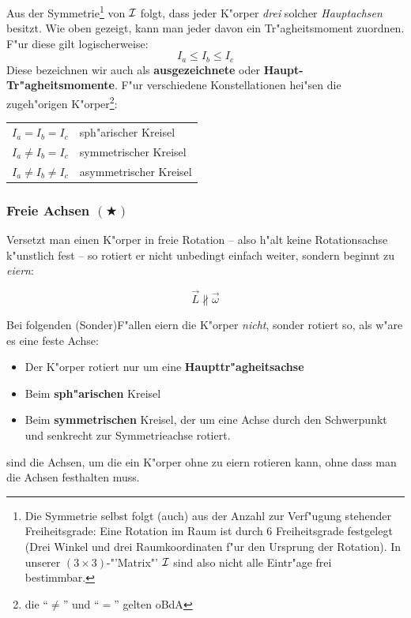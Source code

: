 Aus der Symmetrie\footnote{Die Symmetrie selbst folgt (auch) aus der Anzahl
  zur Verf"ugung stehender Freiheitsgrade: Eine Rotation im Raum ist
  durch  6 Freiheitsgrade festgelegt (Drei Winkel und drei
  Raumkoordinaten f"ur den Ursprung der Rotation). In unserer $(3 \times
  3)$-"'Matrix"' ${\mathcal{I}}$ sind also nicht alle Eintr"age frei bestimmbar.} von
${\mathcal{I}}$ folgt, dass jeder K"orper \emph{drei} solcher
\emph{Hauptachsen} besitzt. Wie oben gezeigt, kann man jeder davon ein
Tr"agheitsmoment zuordnen. F"ur diese gilt logischerweise:
$$
I_a \leq I_b \leq I_c
$$
Diese bezeichnen wir auch als \textbf{ausgezeichnete} oder
\textbf{Haupt-Tr"agheitsmomente}. F"ur verschiedene Konstellationen
hei"sen die zugeh"origen K"orper\footnote{die "`$\neq$"' und "`$=$"'
  gelten oBdA}:
\begin{center}
\begin{tabular}{l l}
   $I_a = I_b = I_c$ & sph"arischer Kreisel \\
   $I_a \neq I_b = I_c$ & symmetrischer Kreisel \\
   $I_a \neq I_b \neq I_c$ & asymmetrischer Kreisel 
\end{tabular}
\end{center}


\subsubsection{Freie Achsen $(\bigstar)$}
\label{kap_freie-achsen}

Versetzt man einen K"orper in freie Rotation -- also h"alt keine
Rotationsachse k"unstlich fest -- so rotiert er nicht unbedingt einfach
weiter, sondern beginnt zu \emph{eiern}: 

$$
\vec L \not \parallel \vec \omega
$$

Bei folgenden (Sonder)F"allen eiern die K"orper \emph{nicht}, sonder
rotiert so, als w"are es eine feste Achse:
\begin{itemize}
\item Der K"orper rotiert nur um eine \textbf{Haupttr"agheitsachse}
\item Beim \textbf{sph"arischen} Kreisel
\item Beim \textbf{symmetrischen} Kreisel, der um eine Achse durch den
   Schwerpunkt und senkrecht zur Symmetrieachse rotiert. 
\end{itemize}

\begin{Def}
sind die Achsen, um die ein K"orper ohne zu eiern rotieren kann, ohne dass man die Achsen festhalten muss.
\end{Def}

